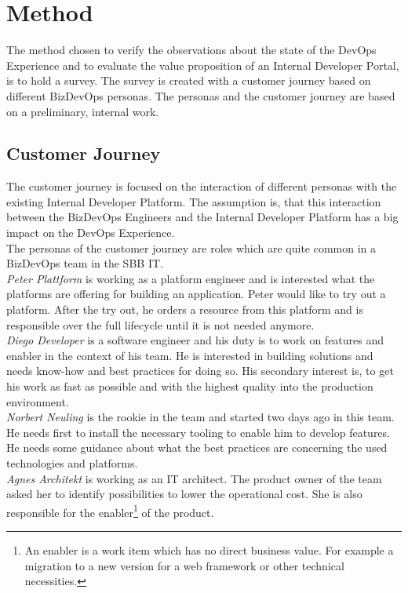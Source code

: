 \documentclass[a4paper,12pt]{article}
\begin{document}
    \section{Method}
    \label{sec:method}
    The method chosen to verify the observations about the state of the DevOps Experience and to evaluate the value proposition
    of an Internal Developer Portal, is to hold a survey.
    The survey is created with a customer journey based on different BizDevOps personas.
    The personas and the customer journey are based on a preliminary, internal work\parencite{sbbjobstobedone}.

    \subsection{Customer Journey}
    \label{subsec:cusjour}
    The customer journey is focused on the interaction of different personas with the existing Internal Developer Platform.
    The assumption is, that this interaction between the BizDevOps Engineers and the Internal Developer Platform has a big
    impact on the DevOps Experience.\\
    The personas of the customer journey are roles which are quite common in a BizDevOps team in the SBB IT.\\
    \textit{Peter Plattform} is working as a platform engineer and is interested what the platforms are offering for building
    an application.
    Peter would like to try out a platform.
    After the try out, he orders a resource from this platform and is responsible over the full lifecycle until it is not
    needed anymore.\\
    \textit{Diego Developer} is a software engineer and his duty is to work on features and enabler in the context of his team.
    He is interested in building solutions and needs know-how and best practices for doing so.
    His secondary interest is, to get his work as fast as possible and with the highest quality into the production environment.\\
    \textit{Norbert Neuling} is the rookie in the team and started two days ago in this team.
    He needs first to install the necessary tooling to enable him to develop features.
    He needs some guidance about what the best practices are concerning the used technologies and platforms.\\
    \textit{Agnes Architekt} is working as an IT architect.
    The product owner of the team asked her to identify possibilities to lower the operational cost.
    She is also responsible for the enabler\footnote{An enabler is a work item which has no direct business value.
    For example a migration to a new version for a web framework or other technical necessities.} of the product.
\end{document}
